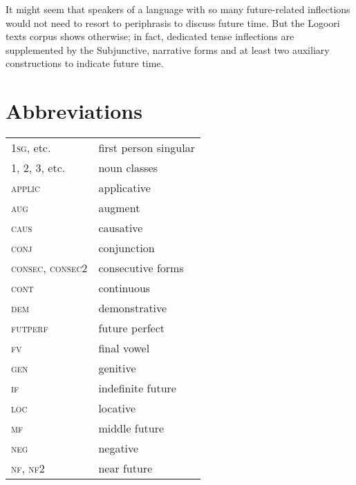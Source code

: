 \documentclass[output=paper]{langsci/langscibook}
\begin{document}
It might seem that speakers of a language with so many future-related inflections would not need to resort to periphrasis to discuss future time. But the Logoori texts corpus shows otherwise; in fact, dedicated tense inflections are supplemented by the Subjunctive, narrative forms and at least two auxiliary constructions to indicate future time.

\section*{Abbreviations}

\begin{longtable}[l]{ll}
\textsc{1sg}, etc. &  first person singular \\

1, 2, 3, etc. & noun classes \\

\textsc{applic} & applicative \\

\textsc{aug}  &  augment\\

\textsc{caus} &   causative \\

\textsc{conj}   &  conjunction \\

\textsc{consec, consec2} &  consecutive forms \\

\textsc{cont}  &  continuous \\

\textsc{dem}  &  demonstrative \\

\textsc{futperf} & future perfect \\

\textsc{fv}  &  final vowel \\

\textsc{gen}  &  genitive \\

\textsc{if}  &  indefinite future \\

\textsc{loc}  &  locative \\

\textsc{mf} &   middle future \\

\textsc{neg}  &  negative \\

\textsc{nf, nf2} & near future \\


\end{longtable}
\end{document}
